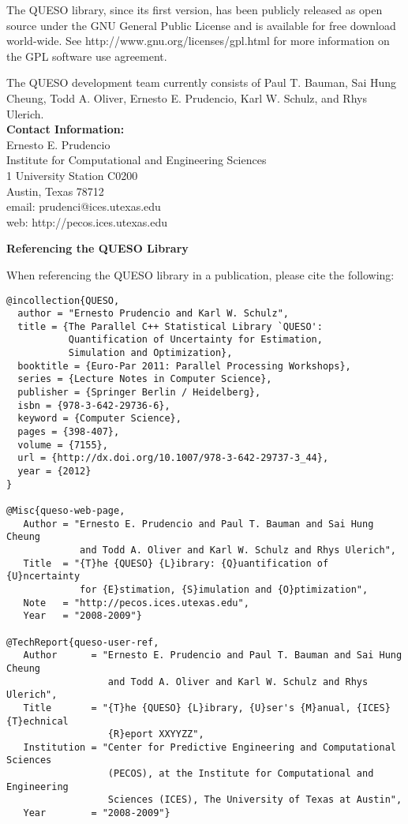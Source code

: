 The QUESO library, since its first version, has been publicly released as open source
under the GNU General Public License and is available for free download world-wide.
See http://www.gnu.org/licenses/gpl.html for more information on the GPL software use agreement.

The QUESO development team currently consists of
Paul T. Bauman,
Sai Hung Cheung,
Todd A. Oliver,
Ernesto E. Prudencio,
Karl W. Schulz, and
Rhys Ulerich.\\

{\bf Contact Information:}\\
Ernesto E. Prudencio\\
Institute for Computational and Engineering Sciences\\
1 University Station C0200\\
Austin, Texas 78712\\
email: prudenci@ices.utexas.edu\\
web: http://pecos.ices.utexas.edu\\
$~$\\

\centerline{\bf Referencing the QUESO Library}

When referencing the QUESO library in a publication, please cite the following:
\begin{verbatim}
@incollection{QUESO,
  author = "Ernesto Prudencio and Karl W. Schulz",
  title = {The Parallel C++ Statistical Library `QUESO':
           Quantification of Uncertainty for Estimation,
           Simulation and Optimization},
  booktitle = {Euro-Par 2011: Parallel Processing Workshops},
  series = {Lecture Notes in Computer Science},
  publisher = {Springer Berlin / Heidelberg},
  isbn = {978-3-642-29736-6},
  keyword = {Computer Science},
  pages = {398-407},
  volume = {7155},
  url = {http://dx.doi.org/10.1007/978-3-642-29737-3_44},
  year = {2012}
}

@Misc{queso-web-page,
   Author = "Ernesto E. Prudencio and Paul T. Bauman and Sai Hung Cheung
             and Todd A. Oliver and Karl W. Schulz and Rhys Ulerich",
   Title  = "{T}he {QUESO} {L}ibrary: {Q}uantification of {U}ncertainty
             for {E}stimation, {S}imulation and {O}ptimization",
   Note   = "http://pecos.ices.utexas.edu",
   Year   = "2008-2009"}

@TechReport{queso-user-ref,
   Author      = "Ernesto E. Prudencio and Paul T. Bauman and Sai Hung Cheung
                  and Todd A. Oliver and Karl W. Schulz and Rhys Ulerich",
   Title       = "{T}he {QUESO} {L}ibrary, {U}ser's {M}anual, {ICES} {T}echnical
                  {R}eport XXYYZZ",
   Institution = "Center for Predictive Engineering and Computational Sciences
                  (PECOS), at the Institute for Computational and Engineering
                  Sciences (ICES), The University of Texas at Austin",
   Year        = "2008-2009"}
\end{verbatim}
$~$\\
$~$\\

